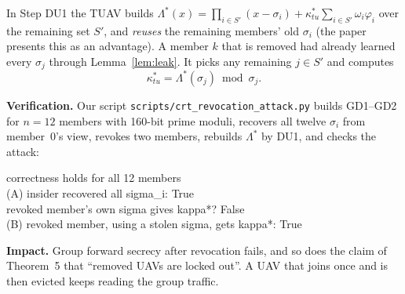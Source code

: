 \begin{flawbox}[title={A revoked UAV still obtains the new group key (verified)}]
\begin{finding}\label{f:crt}
In Step DU1 the TUAV builds $\Lambda^*(x)=\prod_{i\in S'}(x-\sigma_i)+\kappa^*_{tu}\sum_{i\in S'}\omega_i\varphi_i$ over the remaining set $S'$, and
\emph{reuses} the remaining members' old $\sigma_i$ (the paper presents this as an advantage). A member $k$ that is removed had already learned every
$\sigma_j$ through Lemma~\ref{lem:leak}. It picks any remaining $j\in S'$ and computes
\[
  \kappa^*_{tu}=\Lambda^*(\sigma_j)\bmod\sigma_j .
\]
\end{finding}
\textbf{Verification.} Our script \texttt{scripts/crt\_revocation\_attack.py} builds GD1--GD2 for $n=12$ members with 160-bit prime moduli, recovers
all twelve $\sigma_i$ from member~0's view, revokes two members, rebuilds $\Lambda^*$ by DU1, and checks the attack:
\begin{center}
\begin{tcolorbox}[colback=black!85,colframe=black!85,coltext=white,width=0.82\linewidth,arc=1mm,boxrule=0pt,fontupper=\ttfamily\small]
correctness holds for all 12 members\\
(A) insider recovered all sigma\_i: True\\
\hspace*{1.5em}revoked member's own sigma gives kappa*? False\\
(B) revoked member, using a stolen sigma, gets kappa*: True
\end{tcolorbox}
\end{center}
\textbf{Impact.} Group forward secrecy after revocation fails, and so does the claim of Theorem~5 that ``removed UAVs are locked out''. A UAV that joins
once and is then evicted keeps reading the group traffic.
\end{flawbox}

